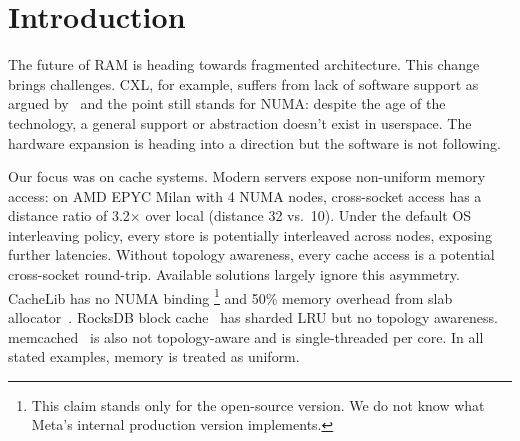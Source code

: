 \documentclass[sigplan,10pt]{acmart}
\begin{document}
\section{Introduction}
\label{sec:intro}

%
%
%
The future of RAM is heading towards fragmented architecture. This change brings challenges. CXL, for example, 
suffers from lack of software support as argued by~\cite{Levis2023CXL}
and the point still stands for NUMA: despite the age of the technology,
a general support or abstraction doesn't exist in userspace. 
The hardware expansion is heading into a direction but the software is not following.
%

Our focus was on cache systems. Modern servers expose non-uniform memory access: on AMD EPYC Milan with 4 NUMA nodes, cross-socket access has a distance ratio of 3.2$\times$ over local (distance 32 vs.\ 10).
Under the default OS interleaving policy, every store is potentially interleaved across nodes, exposing further latencies.
Without topology awareness, every cache access is a potential cross-socket round-trip.
Available solutions largely ignore this asymmetry. CacheLib has no NUMA binding \footnote{This claim stands only for the open-source version. We do not know what Meta's internal production version implements.}
and 50\% memory overhead from slab allocator~\cite{slab}.
RocksDB block cache~\cite{rocksdb} has sharded LRU but no topology awareness.
memcached~\cite{memcached} is also not topology-aware and is single-threaded per core.
In all stated examples, memory is treated as uniform.
%
\end{document}
